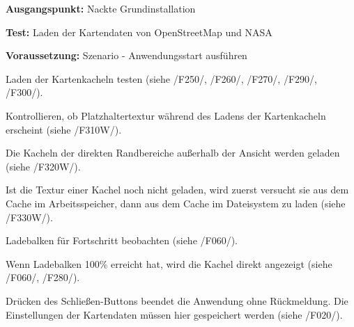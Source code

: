 \documentclass[10pt]{scrreprt}
\newcommand{\sfbf}[1]{\textbf{\sffamily #1}}
\newcommand{\ziel}[1]{{\fontsize{9.5}{11}\textsf{/#1/}}}
\newcommand{\ziellabel}{Z}
\newcommand{\muss}{\renewcommand{\labelenumi}{\textbf{\ziel{\ziellabel\numprint{\theenumi}0}}}}
\newcommand{\wunsch}{\renewcommand{\labelenumi}{\textbf{\ziel{\ziellabel\numprint{\theenumi}0W}}}}
\newenvironment{details}[1][6pt]{%
  \parskip#1 \parindent6mm \raggedright%
  \def\item{\par\ignorespaces\hangindent=5mm \hangafter1}}{%
  \par\ignorespaces}
\begin{document}
\vspace{1.0cm}
\begin{details}[2pt]
\item \sfbf{Ausgangspunkt:} Nackte Grundinstallation \\
\item \sfbf{Test:} Laden der Kartendaten von OpenStreetMap und NASA \\
\item \sfbf{Voraussetzung:} Szenario - Anwendungsstart ausführen
\end{details}
\vspace{2mm}
\begin{enumerate}[leftmargin = 2.2cm, resume]
\item Laden der Kartenkacheln testen (siehe \ziel{F250}, \ziel{F260}, \ziel{F270}, \ziel{F290}, \ziel{F300}).
\wunsch
\item Kontrollieren, ob Platzhaltertextur während des Ladens der Kartenkacheln erscheint (siehe \ziel{F310W}).
\item Die Kacheln der direkten Randbereiche außerhalb der Ansicht werden geladen (siehe \ziel{F320W}).
\item Ist die Textur einer Kachel noch nicht geladen, wird zuerst versucht sie aus dem Cache im Arbeitsspeicher, dann aus dem Cache im Dateisystem zu laden (siehe \ziel{F330W}).
\muss
\item Ladebalken für Fortschritt beobachten (siehe \ziel{F060}).
\item Wenn Ladebalken 100\% erreicht hat, wird die Kachel direkt angezeigt (siehe \ziel{F060}, \ziel{F280}).
\item Drücken des Schließen-Buttons beendet die Anwendung ohne Rückmeldung. Die Einstellungen der Kartendaten müssen hier gespeichert werden (siehe \ziel{F020}).
\end{enumerate}
\end{document}
